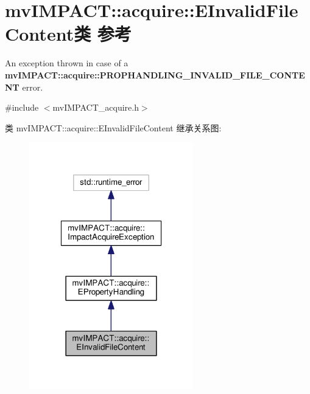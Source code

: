 \hypertarget{classmv_i_m_p_a_c_t_1_1acquire_1_1_e_invalid_file_content}{\section{mv\+I\+M\+P\+A\+C\+T\+:\+:acquire\+:\+:E\+Invalid\+File\+Content类 参考}
\label{classmv_i_m_p_a_c_t_1_1acquire_1_1_e_invalid_file_content}
}


An exception thrown in case of a {\bfseries mv\+I\+M\+P\+A\+C\+T\+::acquire\+::\+P\+R\+O\+P\+H\+A\+N\+D\+L\+I\+N\+G\+\_\+\+I\+N\+V\+A\+L\+I\+D\+\_\+\+F\+I\+L\+E\+\_\+\+C\+O\+N\+T\+E\+N\+T} error.  




{\ttfamily \#include $<$mv\+I\+M\+P\+A\+C\+T\+\_\+acquire.\+h$>$}



类 mv\+I\+M\+P\+A\+C\+T\+:\+:acquire\+:\+:E\+Invalid\+File\+Content 继承关系图\+:
\nopagebreak
\begin{figure}[H]
\begin{center}
\leavevmode
\includegraphics[width=202pt]{classmv_i_m_p_a_c_t_1_1acquire_1_1_e_invalid_file_content__inherit__graph}
\end{center}
\end{figure}


